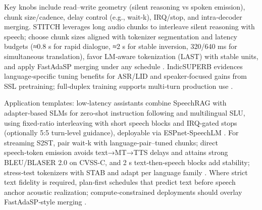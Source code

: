 \documentclass{article}
\begin{document}
Key knobs include read–write geometry (silent reasoning vs spoken emission), chunk size/cadence, delay control (e.g., wait‑k), IRQ/stop, and intra‑decoder merging. STITCH leverages long audio chunks to interleave silent reasoning with speech; choose chunk sizes aligned with tokenizer segmentation and latency budgets (≈0.8 s for rapid dialogue, ≈2 s for stable inversion, 320/640 ms for simultaneous translation), favor LM‑aware tokenization (LAST) with stable units, and apply FastAdaSP merging under any schedule \cite{chiang2025stitchsimultaneousthinkingtalkingchunked,turetzky2024lastlanguagemodelawarespeechtokenization,lu2024fastadaspmultitaskadaptedefficientinfere,vashishth2024stabspeechtokenizerassessmentbenchmark,kando2025exploringeffectsegmentationvocabularysiz,guo2025streamuniachievingstreamingspeechtransla}. IndicSUPERB evidences language‑specific tuning benefits for ASR/LID and speaker‑focused gains from SSL pretraining; full‑duplex training supports multi‑turn production use \cite{entry2025indicsuperbspeechprocessinguniversalperf,yang2024buildingtaiwanesemandarinspokenlanguagem}.

Application templates: low‑latency assistants combine SpeechRAG with adapter‑based SLMs for zero‑shot instruction following and multilingual SLU, using fixed‑ratio interleaving with short speech blocks and IRQ‑gated stops (optionally 5:5 turn‑level guidance), deployable via ESPnet‑SpeechLM \cite{min2025speechretrievalaugmentedgenerationwithou,wang2023slmbridgethingapbetweenspeechtextfoundat,tian2025espnetspeechlmopenspeechlanguagemodeltoo,entry2025indicsuperbspeechprocessinguniversalperf}. For streaming S2ST, pair wait‑k with language‑pair–tuned chunks; direct speech‑token emission avoids text→MT→TTS delays and attains strong BLEU/BLASER 2.0 on CVSS‑C, and 2 s text‑then‑speech blocks add stability; stress‑test tokenizers with STAB and adapt per language family \cite{zhao2024textlessstreamingspeechtranslationsemant,entry2025indicsuperbspeechprocessinguniversalperf,vashishth2024stabspeechtokenizerassessmentbenchmark}. Where strict text fidelity is required, plan‑first schedules that predict text before speech anchor acoustic realization; compute‑constrained deployments should overlay FastAdaSP‑style merging \cite{turetzky2024lastlanguagemodelawarespeechtokenization,wu2023speechgenunlockinggenerativepowerspeechl,lu2024fastadaspmultitaskadaptedefficientinfere}.
\end{document}
